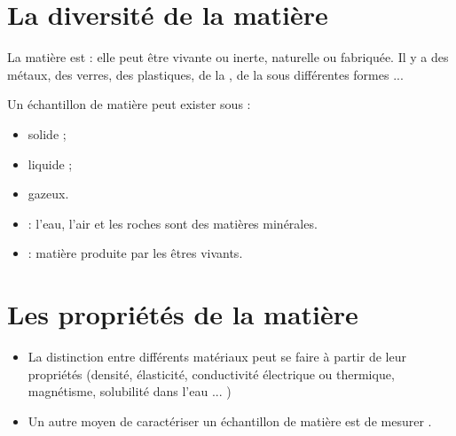 \documentclass[12pt,a4paper]{article}
\date{}
\title{}
\begin{document}
	
	

\section{La diversité de la matière}

\begin{mybilan}
	La matière est  : elle peut être vivante ou inerte, naturelle ou fabriquée. Il y a des métaux, des verres, des plastiques, de la , de la  sous différentes formes ...


Un échantillon de matière peut exister sous  :
\begin{itemize}
	\item solide ;
	\item liquide ;
	\item gazeux.
\end{itemize}

\end{mybilan}

\begin{mydefs}
	\begin{itemize}
		\item {} : \pause  l'eau, l'air et les roches sont des matières minérales.\pause
		
		\item {} : \pause matière produite par les êtres vivants.
	\end{itemize}
\end{mydefs}

\section{Les propriétés de la matière}

\begin{mybilan}
	\begin{itemize}
		\item La distinction entre différents matériaux peut se faire à partir de leur propriétés (densité, élasticité, conductivité électrique ou thermique, magnétisme, solubilité dans l'eau ...  )
		
		\item Un autre moyen de caractériser un échantillon de matière est de mesurer . 
	\end{itemize}
\end{mybilan}
\end{document}

